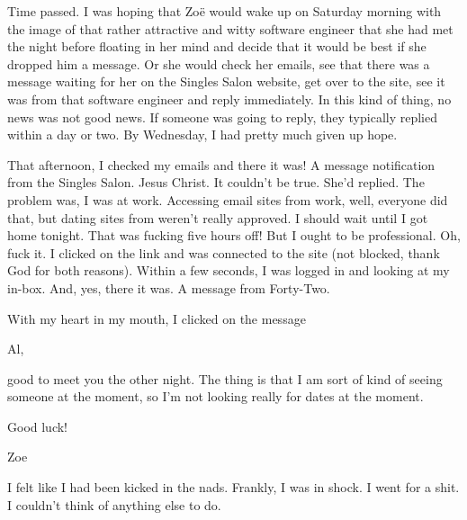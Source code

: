 Time passed. I was hoping that Zoë would wake up on Saturday
morning with the image of that rather attractive and witty software
engineer that she had met the night before floating in her mind and
decide that it would be best if she dropped him a message. Or she
would check her emails, see that there was a message waiting for her
on the Singles Salon website, get over to the site, see it was from
that software engineer and reply immediately. In this kind of thing,
no news was not good news. If someone was going to reply, they
typically replied within a day or two. By Wednesday, I had pretty
much given up hope.

That afternoon, I checked my emails and there it was! A message
notification from the Singles Salon. Jesus Christ. It couldn't be
true. She'd replied. The problem was, I was at work. Accessing email
sites from work, well, everyone did that, but dating sites from
weren't really approved. I should wait until I got home tonight.
That was fucking five hours off! But I ought to be professional. Oh,
fuck it. I clicked on the link and was connected to the site (not
blocked, thank God for both reasons). Within a few seconds, I was
logged in and looking at my in-box. And, yes, there it was. A
message from Forty-Two.

With my heart in my mouth, I clicked on the message

{\twelvett Al,

good to meet you the other night. The thing is that I am sort of
kind of seeing someone at the moment, so I'm not looking really for
dates at the moment.

Good luck!

Zoe}

I felt like I had been kicked in the nads. Frankly, I was in shock.
I went for a shit. I couldn't think of anything else to do.

